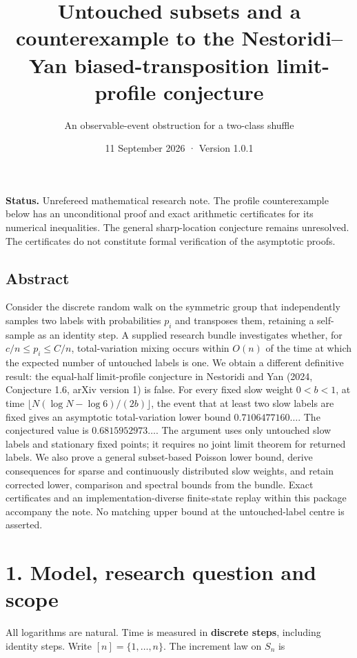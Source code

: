 \documentclass[
  british,
  11pt,
]{article}
\title{Untouched subsets and a counterexample to the Nestoridi--Yan
biased-transposition limit-profile conjecture}
\subtitle{An observable-event obstruction for a two-class shuffle}
\author{}
\date{11 September 2026 · Version 1.0.1}
\begin{document}
\maketitle

\textbf{Status.} Unrefereed mathematical research note. The profile
counterexample below has an unconditional proof and exact arithmetic
certificates for its numerical inequalities. The general sharp-location
conjecture remains unresolved. The certificates do not constitute formal
verification of the asymptotic proofs.

\subsection{Abstract}\label{abstract}

Consider the discrete random walk on the symmetric group that
independently samples two labels with probabilities \(p_i\) and
transposes them, retaining a self-sample as an identity step. A supplied
research bundle investigates whether, for \(c/n\le p_i\le C/n\),
total-variation mixing occurs within \(O(n)\) of the time at which the
expected number of untouched labels is one. We obtain a different
definitive result: the equal-half limit-profile conjecture in Nestoridi
and Yan (2024, Conjecture 1.6, arXiv version 1) is false. For every
fixed slow weight \(0<b<1\), at time
\(\lfloor N(\log N-\log 6)/(2b)\rfloor\), the event that at least two
slow labels are fixed gives an asymptotic total-variation lower bound
\(0.7106477160\ldots\). The conjectured value is \(0.6815952973\ldots\).
The argument uses only untouched slow labels and stationary fixed
points; it requires no joint limit theorem for returned labels. We also
prove a general subset-based Poisson lower bound, derive consequences
for sparse and continuously distributed slow weights, and retain
corrected lower, comparison and spectral bounds from the bundle. Exact
certificates and an implementation-diverse finite-state replay within
this package accompany the note. No matching upper bound at the
untouched-label centre is asserted.

\section{1. Model, research question and
scope}\label{model-research-question-and-scope}

All logarithms are natural. Time is measured in \textbf{discrete steps},
including identity steps. Write \([n]=\{1,\ldots,n\}\). The increment
law on \(S_n\) is
\end{document}
